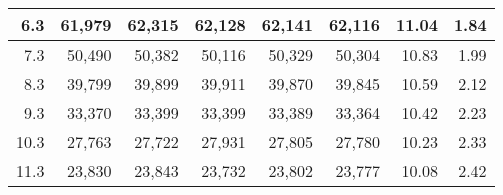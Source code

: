 \begin{table}[h]
\begin{tabular}{|r|r|r|r|r|r|r|r|}
    		6.3                                                    & 61,979                                               & 62,315                                               & 62,128                                               & 62,141                                                  & 62,116                                                 & 11.04                                             & 1.84                                              \\ \hline
    		7.3                                                    & 50,490                                               & 50,382                                               & 50,116                                               & 50,329                                                  & 50,304                                                 & 10.83                                             & 1.99                                              \\ \hline
    		8.3                                                    & 39,799                                               & 39,899                                               & 39,911                                               & 39,870                                                  & 39,845                                                 & 10.59                                             & 2.12                                              \\ \hline
    		9.3                                                    & 33,370                                               & 33,399                                               & 33,399                                               & 33,389                                                  & 33,364                                                 & 10.42                                             & 2.23                                              \\ \hline
    		10.3                                                   & 27,763                                               & 27,722                                               & 27,931                                               & 27,805                                                  & 27,780                                                 & 10.23                                             & 2.33                                              \\ \hline
    		11.3                                                   & 23,830                                               & 23,843                                               & 23,732                                               & 23,802                                                  & 23,777                                                 & 10.08                                             & 2.42                                              \\ \hline

\end{tabular}
\end{table}
